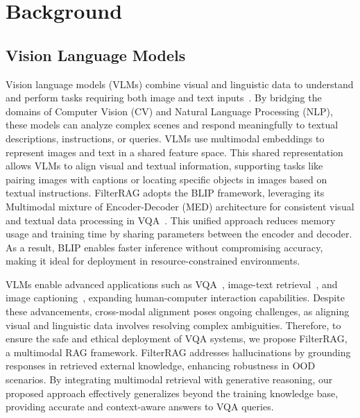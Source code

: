 \section{Background}
\label{sec:Background}

\subsection{Vision Language Models}
Vision language models (VLMs) combine visual and linguistic data to understand and perform tasks requiring both image and text inputs~\cite{radford2021learning, jia2021scaling, singh2022flava}. By bridging the domains of Computer Vision (CV) and Natural Language Processing (NLP), these models can analyze complex scenes and respond meaningfully to textual descriptions, instructions, or queries. VLMs use multimodal embeddings to represent images and text in a shared feature space. This shared representation allows VLMs to align visual and textual information, supporting tasks like pairing images with captions or locating specific objects in images based on textual instructions. FilterRAG adopts the BLIP framework, leveraging its Multimodal mixture of Encoder-Decoder (MED) architecture for consistent visual and textual data processing in VQA~\cite{li2022blip}. This unified approach reduces memory usage and training time by sharing parameters between the encoder and decoder. As a result, BLIP enables faster inference without compromising accuracy, making it ideal for deployment in resource-constrained environments.

VLMs enable advanced applications such as VQA~\cite{antol2015vqa, zhang2016yin, goyal2017making}, image-text retrieval~\cite{luo2023end}, and image captioning~\cite{li2024lamp, covert2024locality}, expanding human-computer interaction capabilities. Despite these advancements, cross-modal alignment poses ongoing challenges, as aligning visual and linguistic data involves resolving complex ambiguities. Therefore, to ensure the safe and ethical deployment of VQA systems, we propose FilterRAG, a multimodal RAG framework. FilterRAG addresses hallucinations by grounding responses in retrieved external knowledge, enhancing robustness in OOD scenarios. By integrating multimodal retrieval with generative reasoning, our proposed approach effectively generalizes beyond the training knowledge base, providing accurate and context-aware answers to VQA queries.

